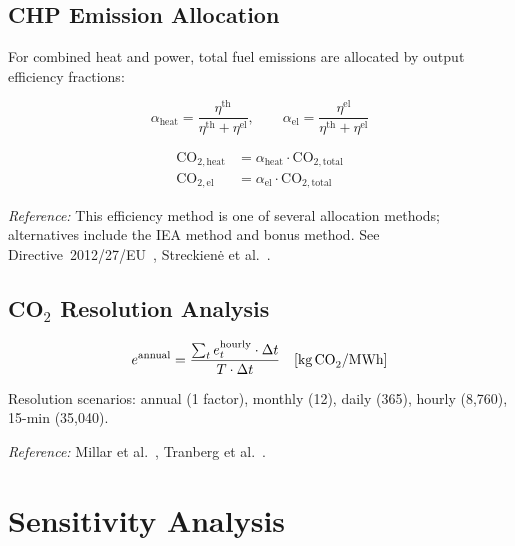 \documentclass[a4paper,12pt]{article}
\begin{document}
\subsection{CHP Emission Allocation}

For combined heat and power, total fuel emissions are allocated by output efficiency fractions:

\begin{equation}
  \alpha_{\text{heat}}
  = \frac{\eta^{\text{th}}}{\eta^{\text{th}} + \eta^{\text{el}}},
  \qquad
  \alpha_{\text{el}}
  = \frac{\eta^{\text{el}}}{\eta^{\text{th}} + \eta^{\text{el}}}
  \tag{CO2-3}
  \label{eq:co2-3}
\end{equation}

\begin{align*}
  \mathrm{CO}_{2,\text{heat}} &= \alpha_{\text{heat}} \cdot \mathrm{CO}_{2,\text{total}} \\
  \mathrm{CO}_{2,\text{el}}   &= \alpha_{\text{el}}   \cdot \mathrm{CO}_{2,\text{total}}
\end{align*}

\noindent\textit{Reference:} This efficiency method is one of several allocation methods;
alternatives include the IEA method and bonus method. See Directive~2012/27/EU~\cite{EU2012},
Streckien\.{e} et al.~\cite{Streckiene2009}.

\subsection{CO\texorpdfstring{$_2$}{2} Resolution Analysis}

\begin{equation}
  e^{\text{annual}}
  = \frac{\sum_t e^{\text{hourly}}_{t} \cdot \Delta t}{T \cdot \Delta t}
  \quad [\text{kg\,CO}_2/\text{MWh}]
  \label{eq:co2-resolution}
\end{equation}

Resolution scenarios: annual (1 factor), monthly (12), daily (365), hourly (8,760),
15-min (35,040).

\noindent\textit{Reference:} Millar et al.~\cite{Millar2021}, Tranberg et al.~\cite{Tranberg2019}.

\section{Sensitivity Analysis}
\label{sec:sensitivity}
\end{document}
